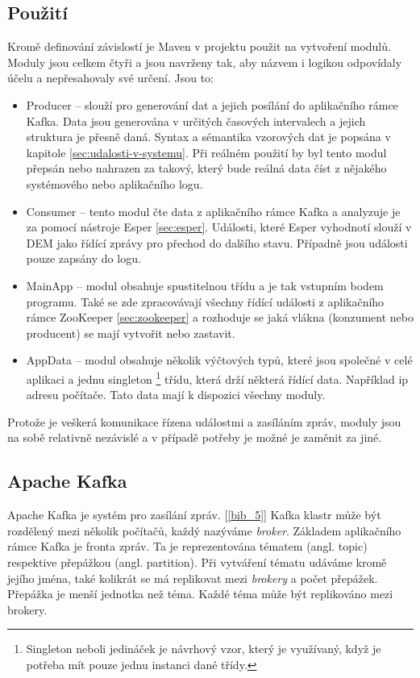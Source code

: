 \documentclass[
  digital, %
  table,   %
  nolof,     %
  nolot,     %
  oneside, %
  nocover,
  monochrome,
  12pt
]{fithesis3}
\begin{document}
\subsection*{Použití}
\label{sec:maven-usage}
Kromě definování závislostí je Maven v projektu použit na vytvoření modulů. Moduly jsou celkem čtyři a jsou navrženy tak, aby názvem i logikou odpovídaly účelu a nepřesahovaly své určení. Jsou to:
\begin{itemize}
  \item Producer -- slouží pro generování dat a jejich posílání do aplikačního rámce Kafka. Data jsou generována v určitých časových intervalech a jejich struktura je přesně daná. Syntax a sémantika vzorových dat je popsána v kapitole \ref{sec:udalosti-v-systemu}. Při reálném použití by byl tento modul přepsán nebo nahrazen za takový, který bude reálná data číst z nějakého systémového nebo aplikačního logu.
  \item Consumer -- tento modul čte data z aplikačního rámce Kafka a analyzuje je za pomocí nástroje Esper \ref{sec:esper}. Události, které Esper vyhodnotí slouží v DEM jako řídící zprávy pro přechod do dalšího stavu. Případně jsou události pouze zapsány do logu.
  \item MainApp -- modul obsahuje spustitelnou třídu a je tak vstupním bodem programu. Také se zde zpracovávají všechny řídící události z aplikačního rámce ZooKeeper \ref{sec:zookeeper} a rozhoduje se jaká vlákna (konzument nebo producent) se mají vytvořit nebo zastavit.
  \item AppData -- modul obsahuje několik výčtových typů, které jsou společné v celé aplikaci a jednu singleton \footnote{Singleton neboli jedináček je návrhový vzor, který je využívaný, když je potřeba mít pouze jednu instanci dané třídy.} třídu, která drží některá řídící data. Například ip adresu počítače. Tato data mají k dispozici všechny moduly.
\end{itemize}
Protože je veškerá komunikace řízena událostmi a zasíláním zpráv, moduly jsou na sobě relativně nezávislé a v případě potřeby je možné je zaměnit za jiné. 

\subsection{Apache Kafka}
Apache Kafka je systém pro zasílání zpráv. [\ref{bib_5}] Kafka klastr může být rozdělený mezi několik počítačů, každý nazýváme \textit{broker}. Základem aplikačního rámce Kafka je fronta zpráv. Ta je reprezentována tématem (angl. topic) respektive přepážkou (angl. partition). Při vytváření tématu udáváme kromě jejího jména, také kolikrát se má replikovat mezi \textit{brokery} a počet přepážek. Přepážka je menší jednotka než téma. Každé téma může být replikováno mezi brokery.
\end{document}
